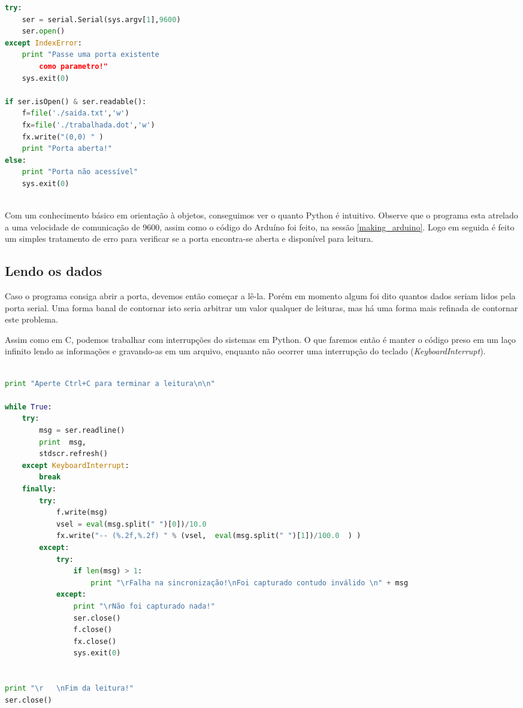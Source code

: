 \begin{multicols}{2}
\begin{lstlisting}[basicstyle=\ttfamily,language=Python,numbers=none,caption={[Acessando a porta serial]Acessando a porta serial}]
try:
	ser = serial.Serial(sys.argv[1],9600)
	ser.open()
except IndexError:
	print "Passe uma porta existente 
		como parametro!"
	sys.exit(0)

if ser.isOpen() & ser.readable():
	f=file('./saida.txt','w')
	fx=file('./trabalhada.dot','w')
	fx.write("(0,0) " )
	print "Porta aberta!"
else:
	print "Porta não acessível"
	sys.exit(0)
	
\end{lstlisting}
Com um conhecimento básico em orientação à objetos, conseguimos ver o quanto Python é intuitivo. Observe que o programa esta atrelado a uma velocidade de comunicação de 9600, assim como o código do Arduíno foi feito, na sessão \ref{making_arduino}. Logo em seguida é feito um simples tratamento de erro para verificar se a porta encontra-se aberta e disponível para leitura.

\subsection{Lendo os dados}\label{reading}


Caso o programa consiga abrir a porta, devemos então começar a lê-la. Porém em momento algum foi dito quantos dados seriam lidos pela porta serial. Uma forma banal de contornar isto seria arbitrar um valor qualquer de leituras, mas há uma forma mais refinada de contornar este problema.

Assim como em C, podemos trabalhar com interrupções do sistemas em Python. O que faremos então é manter o código preso em um laço infinito lendo as informações e gravando-as em um arquivo, enquanto não ocorrer uma interrupção do teclado (\textit{KeyboardInterrupt}).

\begin{lstlisting}[basicstyle=\ttfamily,language=Python,numbers=none,caption={[Lendo dados]Lendo dados ininterruptamente}]

print "Aperte Ctrl+C para terminar a leitura\n\n"

while True:
	try:
		msg = ser.readline()
		print  msg,
		stdscr.refresh()
	except KeyboardInterrupt:
		break	
	finally:
		try:
			f.write(msg)
			vsel = eval(msg.split(" ")[0])/10.0
			fx.write("-- (%.2f,%.2f) " % (vsel,  eval(msg.split(" ")[1])/100.0  ) )
		except:
			try:
				if len(msg) > 1:
					print "\rFalha na sincronização!\nFoi capturado contudo inválido \n" + msg 
			except:
				print "\rNão foi capturado nada!"
				ser.close()
				f.close()
				fx.close()
				sys.exit(0)


print "\r   \nFim da leitura!"
ser.close()


\end{lstlisting}
\end{multicols}

